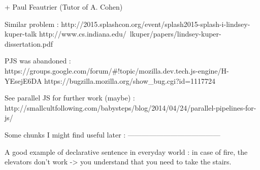+ Paul Feautrier (Tutor of A. Cohen)


Similar problem :
http://2015.splashcon.org/event/splash2015-splash-i-lindsey-kuper-talk
http://www.cs.indiana.edu/~lkuper/papers/lindsey-kuper-dissertation.pdf

PJS was abandoned :
https://groups.google.com/forum/#!topic/mozilla.dev.tech.js-engine/H-YEsejE6DA
https://bugzilla.mozilla.org/show_bug.cgi?id=1117724

See parallel JS for further work (maybe) :
http://smallcultfollowing.com/babysteps/blog/2014/04/24/parallel-pipelines-for-js/

Some chunks I might find useful later :
---------------------------------------

A good example of declarative sentence in everyday world : in case of fire, 
the elevators don't work -> you understand that you need to take the stairs.